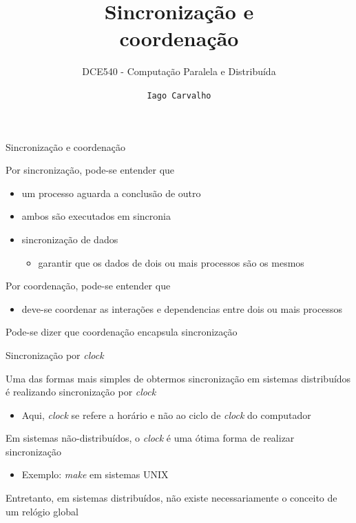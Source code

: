 \documentclass[compress]{beamer}
\title{Sincronização e \\coordenação}
\subtitle{DCE540 - Computação Paralela e Distribuída}
\author{\texttt{Iago Carvalho}}
\institute{\texttt{Departamento de Ciência da Computação}}
\begin{document}
\begin{frame}
\titlepage

\end{frame}


\begin{frame}{Sincronização e coordenação}

Por sincronização, pode-se entender que
\begin{itemize}
    \item um processo aguarda a conclusão de outro
    \item ambos são executados em sincronia
    \item sincronização de dados
    \begin{itemize}
        \item garantir que os dados de dois ou mais processos são os mesmos
    \end{itemize}
\end{itemize}

\vspace{0.5cm}

Por coordenação, pode-se entender que
\begin{itemize}
    \item deve-se coordenar as interações e dependencias entre dois ou mais processos
\end{itemize}

\vspace{0.5cm}

Pode-se dizer que coordenação encapsula sincronização

\end{frame}


\begin{frame}{Sincronização por \textit{clock}}

Uma das formas mais simples de obtermos sincronização em sistemas distribuídos é realizando sincronização por \textit{clock}
\begin{itemize}
    \item Aqui, \textit{clock} se refere a horário e não ao ciclo de \textit{clock} do computador
\end{itemize}

\vspace{0.5cm}

Em sistemas não-distribuídos, o \textit{clock} é uma ótima forma de realizar sincronização
\begin{itemize}
    \item Exemplo: \textit{make} em sistemas UNIX
\end{itemize}

\vspace{0.5cm}

Entretanto, em sistemas distribuídos, não existe necessariamente o conceito de um relógio global
\end{frame}
\end{document}
